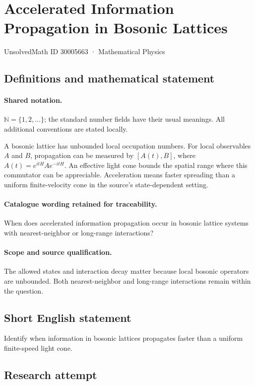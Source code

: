 \documentclass[11pt]{article}
\begin{document}
\setcounter{section}{30005662}
\section{Accelerated Information Propagation in Bosonic Lattices}\label{30005663}
{\small UnsolvedMath ID 30005663 · Mathematical Physics}
\subsection{Definitions and mathematical statement}

\paragraph{Shared notation.}$\mathbb N=\{1,2,\ldots\}$; the standard number fields have their usual meanings. All additional conventions are stated locally.


A bosonic lattice has unbounded local occupation numbers. For local observables $A$ and $B$, propagation can be measured by $[A(t),B]$, where $A(t)=e^{itH}Ae^{-itH}$. An effective light cone bounds the spatial range where this commutator can be appreciable. Acceleration means faster spreading than a uniform finite-velocity cone in the source's state-dependent setting.

\paragraph{Catalogue wording retained for traceability.}
When does accelerated information propagation occur in bosonic lattice systems with nearest-neighbor or long-range interactions?

\paragraph{Scope and source qualification.}The allowed states and interaction decay matter because local bosonic operators are unbounded. Both nearest-neighbor and long-range interactions remain within the question.
\subsection{Short English statement}
Identify when information in bosonic lattices propagates faster than a uniform finite-speed light cone.
\subsection{Research attempt}
\end{document}
